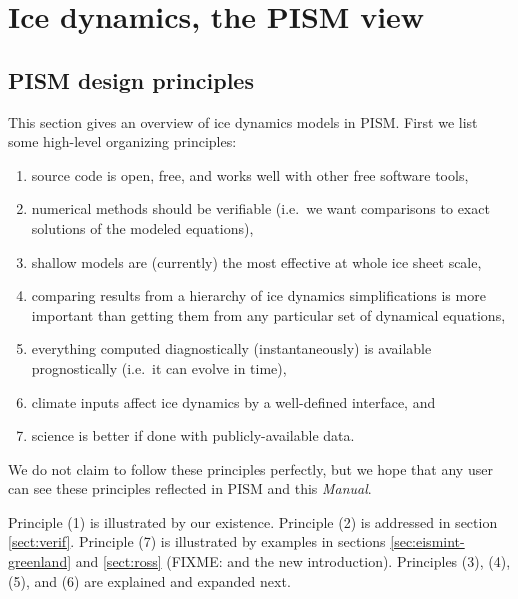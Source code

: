 \documentclass[11pt,final]{amsart}
\newcommand{\ind}[1]{\index{general}{#1}}
\begin{document}
\clearpage\newpage



\clearpage
\newpage
\section{Ice dynamics, the PISM view}\label{sect:dynamics}

\subsection{PISM design principles}\ind{PISM!principles}  This section gives an overview of ice dynamics models in PISM.  First we list some high-level organizing principles:
\begin{enumerate}
\item source code is open, free, and works well with other free software tools,
\item numerical methods should be verifiable (i.e.~we want comparisons to exact solutions of the modeled equations),
\item shallow models are (currently) the most effective at whole ice sheet scale,
\item comparing results from a hierarchy of ice dynamics simplifications is more important than getting them from any particular set of dynamical equations,
\item everything computed diagnostically (instantaneously) is available prognostically (i.e.~it can evolve in time),
\item climate inputs affect ice dynamics by a well-defined interface, and
\item science is better if done with publicly-available data.
\end{enumerate}

\noindent We do not claim to follow these principles perfectly, but we hope that any user can see these principles reflected in PISM and this \emph{Manual}.

Principle (1) is illustrated by our existence.  Principle (2) is addressed in section \ref{sect:verif}.  Principle (7) is illustrated by examples in sections \ref{sec:eismint-greenland} and \ref{sect:ross} (FIXME: and the new introduction).  Principles (3), (4), (5), and (6) are explained and expanded next.
\end{document}
